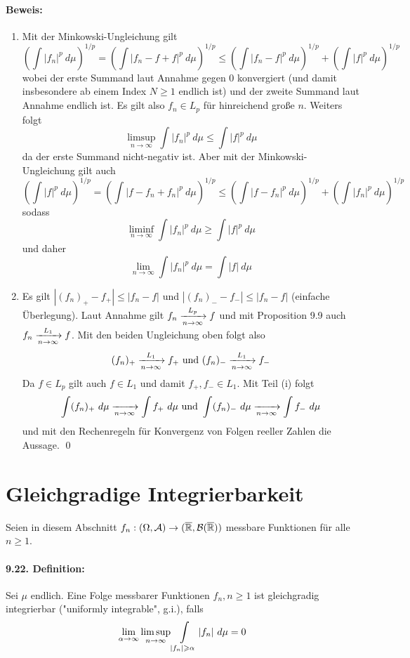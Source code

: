 \documentclass[11pt]{report}
\begin{document}
\paragraph{Beweis:}
\begin{enumerate}[label=(\roman*)]
    \item Mit der Minkowski-Ungleichung gilt
    $$\left(\int|f_n|^p\ d\mu\right)^{1/p}=\left(\int|f_n-f+f|^p\ d\mu\right)^{1/p}\leq\left(\int|f_n-f|^p\ d\mu\right)^{1/p}+\left(\int|f|^p\ d\mu\right)^{1/p}$$
    wobei der erste Summand laut Annahme gegen $0$ konvergiert (und damit insbesondere ab einem Index $N\geq1$ endlich ist) und der zweite Summand laut Annahme endlich ist. Es gilt also $f_n\in L_p$ f\"ur hinreichend gro\ss{}e $n$. Weiters folgt
    $$\limsup_{n\to\infty}\int|f_n|^p\ d\mu\leq\int|f|^p\ d\mu$$
    da der erste Summand nicht-negativ ist.
    Aber mit der Minkowski-Ungleichung gilt auch
    $$\left(\int|f|^p\ d\mu\right)^{1/p}=\left(\int|f-f_n+f_n|^p\ d\mu\right)^{1/p}\leq\left(\int|f-f_n|^p\ d\mu\right)^{1/p}+\left(\int|f_n|^p\ d\mu\right)^{1/p}$$
    sodass 
    $$\liminf_{n\to\infty}\int|f_n|^p\ d\mu\geq\int|f|^p\ d\mu$$
    und daher $$\lim_{n\to\infty}\int|f_n|^p\ d\mu=\int|f|\ d\mu$$
    \item Es gilt $|(f_n)_+-f_+|\leq|f_n-f|$ und $|(f_n)_--f_-|\leq|f_n-f|$ (einfache \"Uberlegung). Laut Annahme gilt $f_n\nto{L_p}{n\to\infty}f$ und mit Proposition 9.9 auch $f_n\nto{L_1}{n\to\infty}f$. Mit den beiden Ungleichung oben folgt also
    $$(f_n)_+\nto{L_1}{n\to\infty}f_+\text{ und }(f_n)_-\nto{L_1}{n\to\infty}f_-$$
    Da $f\in L_p$ gilt auch $f\in L_1$ und damit $f_+,f_-\in L_1$. Mit Teil (i) folgt
    $$\int(f_n)_+\ d\mu\nto{}{n\to\infty}\int f_+\ d\mu\text{ und }\int(f_n)_-\ d\mu\nto{}{n\to\infty}\int f_-\ d\mu$$
    und mit den Rechenregeln f\"ur Konvergenz von Folgen reeller Zahlen die Aussage. \qed
\end{enumerate}

\section*{Gleichgradige Integrierbarkeit}
Seien in diesem Abschnitt $f_n:(\Omega,\mathcal{A})\to(\overline{\mathbb{R}},\mathcal{B}(\overline{\mathbb{R}}))$ messbare Funktionen f\"ur alle $n\geq1$.

\paragraph{9.22. Definition:} Sei $\mu$ endlich. Eine Folge messbarer Funktionen $f_n,n\geq1$ ist gleichgradig integrierbar ("uniformly integrable", g.i.), falls
$$\lim_{\alpha\to\infty}\limsup_{n\to\infty}\int\displaylimits_{|f_n|\geq\alpha}|f_n|\ d\mu=0$$
\end{document}
